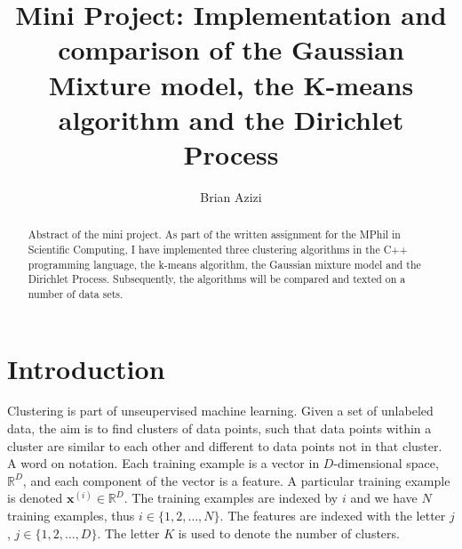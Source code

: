 \documentclass[final,3p,times,twocolumn]{elsarticle}
\begin{document}
\begin{frontmatter}



\title{Mini Project: Implementation and comparison of the Gaussian Mixture model, the K-means algorithm and the Dirichlet Process}


\author{Brian Azizi}

\address{Cavendish Laboratory, Department of Physics, J J Thomson
  Avenue, Cambridge. CB3 0HE}

\begin{abstract}
Abstract of the mini project. As part of the written assignment for the MPhil in Scientific Computing, I have implemented three clustering algorithms in the C++ programming language, the k-means algorithm, the Gaussian mixture model and the Dirichlet Process. Subsequently, the algorithms will be compared and texted on a number of data sets.
\end{abstract}

\end{frontmatter}


\section{Introduction}
\label{sect:Intro}
Clustering is part of unseupervised machine learning. Given a set of unlabeled data, the aim is to find clusters of data points, such that data points within a cluster are similar to each other and different to data points not in that cluster.
A word on notation. Each training example is a vector in $D$-dimensional space, $\mathbb{R}^D$, and each component of the vector is a feature. A particular training example is denoted $\mathbf{x}^{(i)} \in \mathbb{R}^D$. The training examples are indexed by $i$ and we have $N$ training examples, thus $i \in \{1,2,\dots ,N\}$. The features are indexed with the letter $j$, $j \in \{1,2,\dots,D\}$. The letter $K$ is used to denote the number of clusters.
\end{document}
